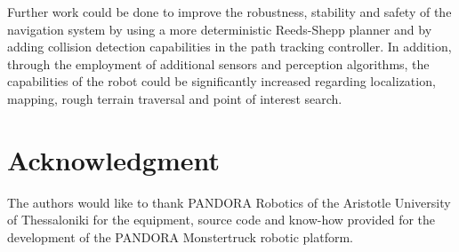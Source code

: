 \documentclass[conference]{IEEEtran}
\begin{document}
Further work could be done to improve the robustness, stability and safety of the navigation system by using a more deterministic Reeds-Shepp planner and by adding collision detection capabilities in the path tracking controller. In addition, through the employment of additional sensors and perception algorithms, the capabilities of the robot could be significantly increased regarding localization, mapping, rough terrain traversal and point of interest search.

\section*{Acknowledgment}
The authors would like to thank PANDORA Robotics of the Aristotle University of Thessaloniki for the equipment, source code and know-how provided for the development of the PANDORA Monstertruck robotic platform.




\end{document}
